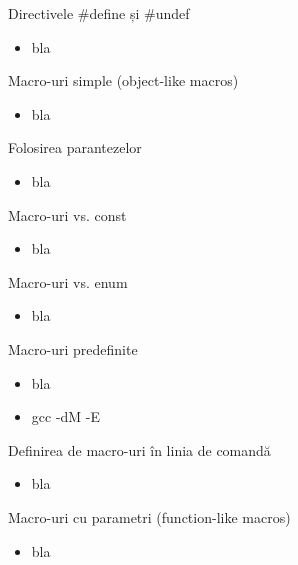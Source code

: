 \documentclass{beamer}
\begin{document}
\frame{\tableofcontents[currentsection]}

\begin{frame}{Directivele \#define și \#undef}
  \begin{itemize}
    \item bla
  \end{itemize}
\end{frame}

\begin{frame}{Macro-uri simple (object-like macros)}
  \begin{itemize}
    \item bla
  \end{itemize}
\end{frame}

\begin{frame}{Folosirea parantezelor}
  \begin{itemize}
    \item bla
  \end{itemize}
\end{frame}

\begin{frame}{Macro-uri vs. const}
  \begin{itemize}
    \item bla
  \end{itemize}
\end{frame}

\begin{frame}{Macro-uri vs. enum}
  \begin{itemize}
    \item bla
  \end{itemize}
\end{frame}

\begin{frame}{Macro-uri predefinite}
  \begin{itemize}
    \item bla
    \item gcc -dM -E
  \end{itemize}
\end{frame}

\begin{frame}{Definirea de macro-uri în linia de comandă}
  \begin{itemize}
    \item bla
  \end{itemize}
\end{frame}

\begin{frame}{Macro-uri cu parametri (function-like macros)}
  \begin{itemize}
    \item bla
  \end{itemize}
\end{frame}
\end{document}

